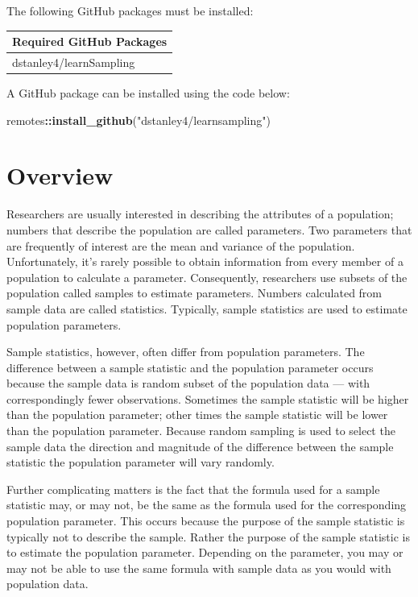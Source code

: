\documentclass[
]{krantz}
\makeatletter
\newenvironment{Shaded}{\begin{snugshade}}{\end{snugshade}}
\newcommand{\KeywordTok}[1]{\textcolor[rgb]{0.27,0.27,0.27}{\textbf{#1}}}
\newcommand{\NormalTok}[1]{#1}
\newcommand{\OperatorTok}[1]{\textcolor[rgb]{0.43,0.43,0.43}{\textbf{#1}}}
\newcommand{\StringTok}[1]{\textcolor[rgb]{0.5,0.5,0.5}{#1}}
\newenvironment{kframe}{%
\medskip{}
\setlength{\fboxsep}{.8em}
 \def\at@end@of@kframe{}%
 \ifinner\ifhmode%
  \def\at@end@of@kframe{\end{minipage}}%
  \begin{minipage}{\columnwidth}%
 \fi\fi%
 \def\FrameCommand##1{\hskip\@totalleftmargin \hskip-\fboxsep
 \colorbox{shadecolor}{##1}\hskip-\fboxsep
     \hskip-\linewidth \hskip-\@totalleftmargin \hskip\columnwidth}%
 \MakeFramed {\advance\hsize-\width
   \@totalleftmargin\z@ \linewidth\hsize
   \@setminipage}}%
 {\par\unskip\endMakeFramed%
 \at@end@of@kframe}
\renewenvironment{Shaded}{\begin{kframe}}{\end{kframe}}
\makeatother
\begin{document}
The following GitHub packages must be installed:

\begin{longtable}[]{@{}l@{}}
\toprule
Required GitHub Packages\tabularnewline
\midrule
\endhead
dstanley4/learnSampling\tabularnewline
\bottomrule
\end{longtable}

A GitHub package can be installed using the code below:

\begin{Shaded}
\begin{Highlighting}[]
\NormalTok{remotes}\OperatorTok{::}\KeywordTok{install_github}\NormalTok{(}\StringTok{"dstanley4/learnsampling"}\NormalTok{)}
\end{Highlighting}
\end{Shaded}

\hypertarget{overview}{%
\section{Overview}\label{overview}}

Researchers are usually interested in describing the attributes of a population; numbers that describe the population are called parameters. Two parameters that are frequently of interest are the mean and variance of the population. Unfortunately, it's rarely possible to obtain information from every member of a population to calculate a parameter. Consequently, researchers use subsets of the population called samples to estimate parameters. Numbers calculated from sample data are called statistics. Typically, sample statistics are used to estimate population parameters.

Sample statistics, however, often differ from population parameters. The difference between a sample statistic and the population parameter occurs because the sample data is random subset of the population data --- with correspondingly fewer observations. Sometimes the sample statistic will be higher than the population parameter; other times the sample statistic will be lower than the population parameter. Because random sampling is used to select the sample data the direction and magnitude of the difference between the sample statistic the population parameter will vary randomly.

Further complicating matters is the fact that the formula used for a sample statistic may, or may not, be the same as the formula used for the corresponding population parameter. This occurs because the purpose of the sample statistic is typically not to describe the sample. Rather the purpose of the sample statistic is to estimate the population parameter. Depending on the parameter, you may or may not be able to use the same formula with sample data as you would with population data.
\end{document}
